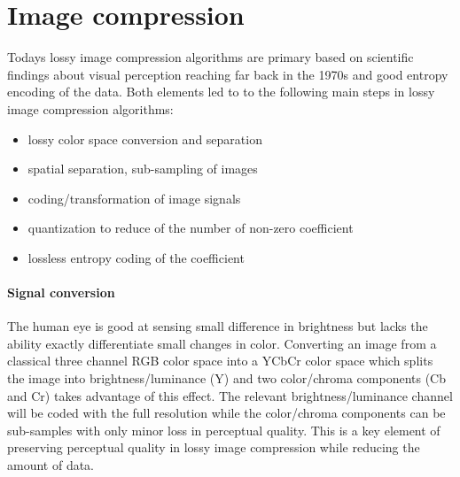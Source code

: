 \section{Image compression}
Todays lossy image compression algorithms are primary based on scientific
findings about visual perception reaching far back in the 1970s\cite{?} and
good entropy encoding of the data. Both elements led to to the
following main steps in lossy image compression algorithms:
\begin{itemize}
 \item lossy color space conversion and separation
 \item spatial separation, sub-sampling of images
 \item coding/transformation of image signals
 \item quantization to reduce of the number of non-zero coefficient 
 \item lossless entropy coding of the coefficient 
\end{itemize}

\paragraph{Signal conversion}
The human eye is good at sensing small difference in brightness but lacks the
ability exactly differentiate small changes in color. Converting an image from a
classical three channel RGB color space into a YCbCr color space which splits
the image into brightness/luminance (Y) and two color/chroma components (Cb
and Cr) takes advantage of this effect. The relevant brightness/luminance
channel will be coded with the full resolution while the color/chroma components
can be sub-samples with only minor loss in perceptual quality. This is a key
element of preserving perceptual quality in lossy image compression while
reducing the amount of data.


